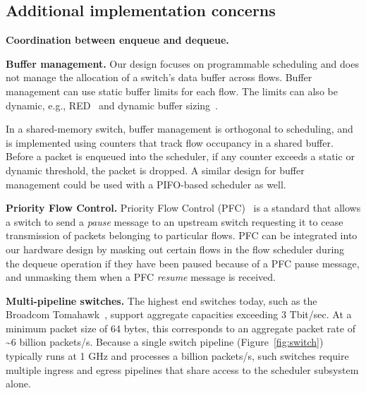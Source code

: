 \subsection{Additional implementation concerns}
\label{ss:add_impl}

\medskip
\noindent
\textbf{Coordination between enqueue and dequeue.}

\medskip
\noindent
\textbf{Buffer management.}
Our design focuses on programmable scheduling and does not manage the allocation
of a switch's data buffer across flows.  Buffer management can use
static buffer limits for each flow. The limits can also be dynamic, e.g.,
RED~\cite{red} and dynamic buffer sizing~\cite{broadcom_dynamic}.

In a shared-memory switch, buffer management is orthogonal to scheduling,
and is implemented using counters that track flow occupancy in a shared
buffer. Before a packet is enqueued into the scheduler, if any counter
 exceeds a static or dynamic threshold, the packet is dropped. A similar
design for buffer management could be used with a PIFO-based scheduler as well.

\medskip
\noindent
\textbf{Priority Flow Control.}
Priority Flow Control (PFC)~\cite{pfc} is a standard that allows a switch to
send a {\em pause} message to an upstream switch requesting it to cease
transmission of packets belonging to particular flows. PFC can be integrated
into our hardware design by masking out certain flows in the flow scheduler
during the dequeue operation if they have been paused because of a PFC pause
message, and unmasking them when a PFC {\em resume} message is received.

\medskip
\noindent
\textbf{Multi-pipeline switches.}
The highest end switches today, such as the Broadcom Tomahawk~\cite{tomahawk},
support aggregate capacities exceeding 3 Tbit/sec. At a minimum packet size of
64 bytes, this corresponds to an aggregate packet rate of \textasciitilde6
billion packets/s. Because a single switch pipeline
(Figure~\ref{fig:switch}) typically runs at 1 GHz and processes a
billion packets/s, such switches require multiple ingress and egress pipelines
that share access to the scheduler subsystem alone.

